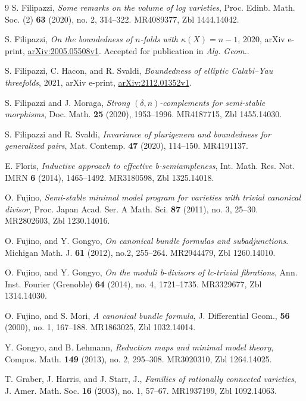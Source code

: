 \documentclass[11pt]{ip-journal}
\theoremstyle{definition}
\begin{document}
\begin{thebibliography}{9}
S. Filipazzi, 
{\it Some remarks on the volume of log varieties},
Proc. Edinb. Math. Soc. (2)
{\bf 63}
(2020),
no. 2,
314--322.
MR4089377,
Zbl 1444.14042.

S. Filipazzi, 
{\it On the boundedness of $n$-folds with $\kappa(X)=n-1$},
2020,
arXiv e-print, 
\href{https://arxiv.org/abs/2005.05508}{arXiv:2005.05508v1}. 
Accepted for publication in 
{\it Alg. Geom.}.

S. Filipazzi,
C. Hacon, 
and 
R. Svaldi,
{\it Boundedness of elliptic {C}alabi--{Y}au threefolds},
2021,
arXiv e-print, 
\href{https://arxiv.org/abs/2112.01352}{arXiv:2112.01352v1}.

S. Filipazzi 
and 
J. Moraga,
{\it Strong {$(\delta,n)$}-complements for semi-stable morphisms},
Doc. Math.
{\bf 25}
(2020),
1953--1996.
MR4187715,
Zbl 1455.14030.

S. Filipazzi
and 
R. Svaldi,
{\it Invariance of plurigenera and boundedness for generalized pairs},
Mat. Contemp.
{\bf 47}
(2020),
114--150.
MR4191137.

E. Floris, 
{\it Inductive approach to effective b-semiampleness},
Int. Math. Res. Not. IMRN
{\bf 6}
(2014),
1465--1492.
MR3180598,
Zbl 1325.14018.

O. Fujino,
{\it Semi-stable minimal model program for varieties with trivial canonical divisor},
Proc. Japan Acad. Ser. A Math. Sci.
{\bf 87}
(2011),
no. 3,
25--30.
MR2802603,
Zbl 1230.14016.	


O. Fujino, 
and 
Y. Gongyo, 
{\it On canonical bundle formulas and subadjunctions}.
Michigan Math. J.
{\bf 61}
(2012), 
no.2, 
255--264.
MR2944479, 
Zbl 1260.14010.


O. Fujino, and Y. Gongyo, 
\emph{On the moduli b-divisors of lc-trivial fibrations},
Ann. Inst. Fourier (Grenoble)
\textbf{64}
(2014),
no. 4,
1721--1735.
MR3329677,
Zbl 1314.14030.

O. Fujino, 
and 
S. Mori, 
\emph{A canonical bundle formula},
J. Differential Geom.,
\textbf{56}
(2000),
no. 1,
167--188.
MR1863025, 
Zbl 1032.14014.


Y. Gongyo, 
and 
B. Lehmann,
\emph{Reduction maps and minimal model theory},
Compos. Math.
\textbf{149}
(2013),
no. 2,
295--308.
MR3020310,
Zbl 1264.14025.

T. Graber, 
J. Harris, 
and 
J. Starr, J.,
\emph{Families of rationally connected varieties},
J. Amer. Math. Soc.
\textbf{16}
(2003),
no. 1,
57--67.
MR1937199,
Zbl 1092.14063.


\end{thebibliography}
\end{document}
